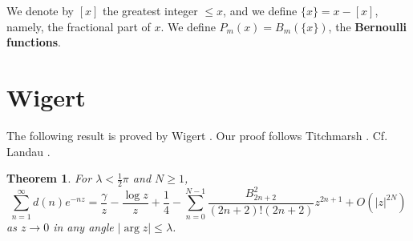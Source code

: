 \documentclass{article}
\newtheorem{theorem}{Theorem}
\begin{document}
We denote by $[x]$ the greatest integer $\leq x$, and we define $\{x\}=x-[x]$, namely, the fractional part of $x$.
We define $P_m(x)=B_m(\{x\})$, the \textbf{Bernoulli functions}.


\section{Wigert}
The following result is proved by Wigert \cite{wigert}. Our proof follows Titchmarsh \cite[p.~163, Theorem 7.15]{zeta}. Cf. Landau \cite{landau}.


\begin{theorem}
For $\lambda<\frac{1}{2}\pi$ and $N \geq 1$,
\[
\sum_{n=1}^\infty d(n) e^{-nz} = \frac{\gamma}{z}-\frac{\log z}{z}+\frac{1}{4}- \sum_{n=0}^{N-1} \frac{B_{2n+2}^2}{(2n+2)!(2n+2)} z^{2n+1}
+O(|z|^{2N})
\]
as $z \to 0$ in any angle $|\arg z| \leq \lambda$.
\label{wigert}
\end{theorem}
\end{document}
